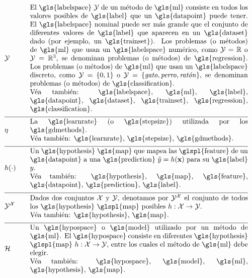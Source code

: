 \begin{align}
	&\labelspace  &\quad & \parbox{.90\textwidth}{El \gls{labelspace} $\labelspace$ de 
		un método de \gls{ml} consiste en todos los valores posibles de \gls{label} que un \gls{datapoint} puede 
		tener. El \gls{labelspace} nominal puede ser más grande que el conjunto de diferentes valores de \gls{label} 
		que aparecen en un \gls{dataset} dado (por ejemplo, un \gls{trainset}). Los problemas 
		(o métodos) de \gls{ml} que usan un \gls{labelspace} numérico, como $\labelspace=\mathbb{R}$ 
		o $\labelspace=\mathbb{R}^{3}$, se denominan problemas (o métodos) de \gls{regression}. Los problemas 
		(o métodos) de \gls{ml} que usan un \gls{labelspace} discreto, como $\labelspace=\{0,1\}$ o $\labelspace=\{\mbox{\emph{gato}},\mbox{\emph{perro}},\mbox{\emph{ratón}}\}$, 
		se denominan problemas (o métodos) de \gls{classification}.
		\\ Véa también: \gls{labelspace}, \gls{ml}, \gls{label}, \gls{datapoint}, \gls{dataset}, \gls{trainset}, 
		\gls{regression}, \gls{classification}.} \nonumber \\[2mm] \hline \nonumber\\[-5mm]
	&\lrate  &\quad & \parbox{.90\textwidth}{La \gls{learnrate} (o \gls{stepsize}) utilizada por los \gls{gdmethods}.
		\\ Véa también: \gls{learnrate}, \gls{stepsize}, \gls{gdmethods}.} \nonumber \\[2mm] \hline \nonumber\\[-5mm]
	&\hypothesis(\cdot)  &\quad &\parbox{.90\textwidth}{Un \gls{hypothesis} \gls{map} que mapea las \glspl{feature} de un \gls{datapoint} 
		a una \gls{prediction} $\hat{\truelabel}=\hypothesis(\featurevec)$ para su \gls{label} $\truelabel$.
		\\ Véa también: \gls{hypothesis}, \gls{map}, \gls{feature}, \gls{datapoint}, \gls{prediction}, \gls{label}.} \nonumber \\[2mm] \hline \nonumber\\[-5mm]
	&\labelspace^{\featurespace} &\quad & \parbox{.90\textwidth}{Dados dos conjuntos $\featurespace$ y $\labelspace$, denotamos por $\labelspace^{\featurespace}$ 
		el conjunto de todos los \gls{hypothesis} \glspl{map} posibles $\hypothesis: \featurespace \rightarrow \labelspace$.
		\\ Véa también: \gls{hypothesis}, \gls{map}.} \nonumber \\[2mm] \hline \nonumber\\[-5mm]
	&\hypospace  &\quad & \parbox{.90\textwidth}{Un \gls{hypospace} o \gls{model} utilizado por un método de \gls{ml}. 
		El \gls{hypospace} consiste en diferentes \gls{hypothesis} \glspl{map} $\hypothesis: \featurespace \rightarrow \labelspace$, entre los cuales 
		el método de \gls{ml} debe elegir.
		\\ Véa también: \gls{hypospace}, \gls{model}, \gls{ml}, \gls{hypothesis}, \gls{map}.} \nonumber 
\end{align}     

